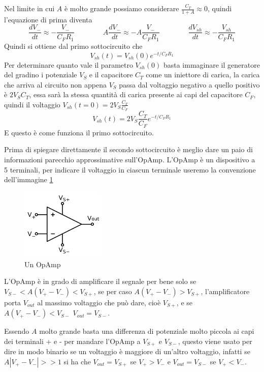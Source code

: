 \documentclass{article}
\newcommand{\vz}{V_{sh}(0)}
\begin{document}
		Nel limite in cui $A$ è molto grande possiamo considerare $\frac{C_T}{1+A}\approx0$, quindi l'equazione di prima diventa
		\[
			\frac{dV_-}{dt}\approx-\frac{V_-}{C_FR_1}\qquad\qquad
			A\frac{dV_-}{dt}\approx-A\frac{V_-}{C_FR_1}\qquad\qquad
			\frac{dV_{sh}}{dt}\approx-\frac{V_{sh}}{C_FR_1}
		\]
		Quindi si ottiene dal primo sottocircuito che\newline
		\[
			V_{sh}(t)=V_{sh}(0)e^{-t/C_FR_1}
		\]
		Per determinare quanto vale il parametro $\vz$ basta immaginare il generatore del gradino i potenziale $V_S$ e il capacitore $C_T$ come un iniettore di carica, la carica che arriva al circuito non appena $V_S$ passa dal voltaggio negativo a quello positivo è $2V_SC_T$, essa sarà la stessa quantità di carica presente ai capi del capacitore $C_F$, quindi il voltaggio $V_{sh}(t=0)=2V_S\frac{C_T}{C_F}$
		\begin{equation}
			V_{sh}(t)=2V_S\frac{C_T}{C_F}e^{-t/C_FR_1}	
		\end{equation}
		E questo è come funziona il primo sottocircuito.\newline

		Prima di spiegare direttamente il secondo sottocircuito è meglio dare un paio di informazioni parecchio approssimative sull'OpAmp.\newline
		L'OpAmp è un dispositivo a 5 terminali, per indicare il voltaggio in ciascun terminale useremo la convenzione dell'immagine \ref{fig:OpAmp1}\newline
		\begin{figure}
			\label{fig:OpAmp1}
			\centering
			\includegraphics[width=40mm]{immagini/OpAmp1.png}
			\caption{Un OpAmp}
		\end{figure}
		L'OpAmp è in grado di amplificare il segnale per bene solo se $V_{S-}<A(V_+-V_-)<V_{S+}$, se per caso $A(V_+-V_-)>V_{S+}$, l'amplificatore porta $V_{out}$ al massimo voltaggio che può dare, cioè $V_{S+}$, e se $A(V_+-V_-)<V_{S-}$ $V_{out}=V_{S-}$.\newline

		Essendo $A$ molto grande basta una differenza di potenziale molto piccola ai capi dei terminali + e - per mandare l'OpAmp a $V_{S+}$ e $V_{S-}$, questo viene usato per dire in modo binario se un voltaggio è maggiore di un'altro voltaggio, infatti se $A|V_+-V_-|>>1$ si ha che $V_{out}=V_{S+}$ se $V_+>V_-$ e $V_{out}=V_{S-}$ se $V_+<V_-$.\newline
\end{document}
